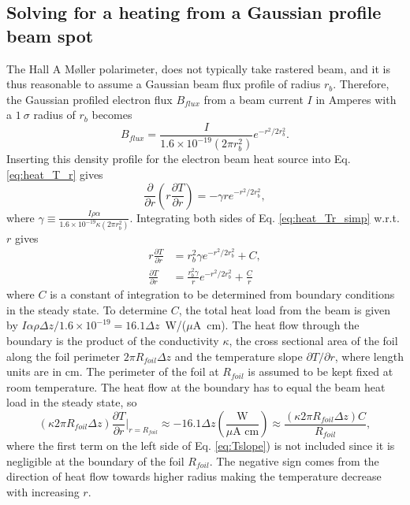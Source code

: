 \documentclass[12pt]{article}
\begin{document}
\subsection{Solving for a heating from a Gaussian profile beam spot}
The Hall A M\o ller polarimeter, does not typically take rastered beam, and it is thus reasonable to assume a Gaussian beam flux profile of radius $r_b$. Therefore, the Gaussian profiled electron flux $B_{flux}$ from a beam current $I$ in Amperes with a $1~\sigma$ radius of $r_{b}$ becomes
\begin{equation}
B_{flux}=\frac{I}{1.6\times 10^{-19} \left(2\pi r_{b}^2\right)}e^{-r^2/2r_b^2}.
\end{equation}
Inserting this density profile for the electron beam heat source into Eq. \ref{eq:heat_T_r} gives
\begin{equation}
\label{eq:heat_Tr_simp}
\frac{\partial}{\partial r}\left(r\frac{\partial T}{\partial r}\right)=-\gamma re^{-r^2/2r_b^2},
\end{equation} 
where $\gamma\equiv\frac{I\rho\alpha}{1.6\times 10^{-19} \kappa\left(2\pi r_{b}^2\right)}$.
Integrating both sides of Eq. \ref{eq:heat_Tr_simp} w.r.t. $r$ gives
\begin{align}
r\frac{\partial T}{\partial r}&=r_b^2\gamma e^{-r^2/2r_b^2}+C,\\
\label{eq:Tslope}
\frac{\partial T}{\partial r}&=\frac{r_b^2\gamma}{r} e^{-r^2/2r_b^2}+\frac{C}{r}
\end{align} 
where $C$ is a constant of integration to be determined from boundary conditions in the steady state. To determine $C$, the total heat load from the beam is given by $I\alpha\rho\Delta z/1.6\times10^{-19}=16.1\Delta z$~W/($\mu$A~cm). The heat flow through the boundary is the product of the conductivity $\kappa$, the cross sectional area of the foil along the foil perimeter $2\pi R_{foil}\Delta z$ and the temperature slope $\partial T /\partial r$, where  length units are in cm. The perimeter of the foil at $R_{foil}$ is assumed to be kept fixed at room temperature. The heat flow at the boundary has to equal the beam heat load in the steady state, so 
\[
\left(\kappa2\pi R_{foil}\Delta z\right) \frac{\partial T}{\partial r}|_{r=R_{foil}}\approx-16.1\Delta z\left(\frac{\textrm{W}}{\mu \textrm{A cm}}\right)\approx\frac{\left(\kappa2\pi R_{foil}\Delta z\right) C}{R_{foil}},
\]
where the first term on the left side of Eq. \ref{eq:Tslope}) is not included since it is negligible at the boundary of the foil $R_{foil}$. The negative sign comes from the direction of heat flow towards higher radius making the temperature decrease with increasing $r$.
\end{document}

